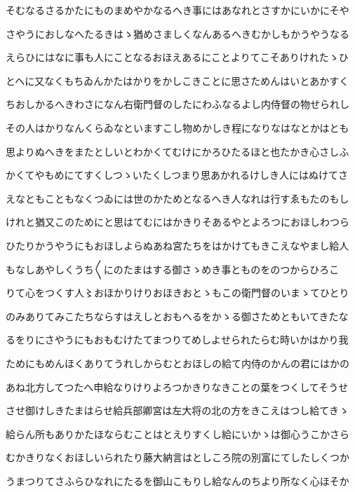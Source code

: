 \documentclass[a4paper,11pt,landscape]{ltjtarticle}
\begin{document}
\par\medskip
そむなるさるかたにものまめやかなるへき事にはあなれとさすかにいかにそや
\par\medskip
さやうにおしなへたるきはゝ猶めさましくなんあるへきむかしもかうやうなる
\par\medskip
えらひにはなに事も人にことなるおほえあるにことよりてこそありけれたゝひ
\par\medskip
とへに又なくもちゐんかたはかりをかしこきことに思さためんはいとあかすく
\par\medskip
ちおしかるへきわさになん右衛門督のしたにわふなるよし内侍督の物せられし
\par\medskip
その人はかりなんくらゐなといますこし物めかしき程になりなはなとかはとも
\par\medskip
思よりぬへきをまたとしいとわかくてむけにかろひたるほと也たかき心さしふ
\par\medskip
かくてやもめにてすくしつゝいたくしつまり思あかれるけしき人にはぬけてさ
\par\medskip
えなともこともなくつゐには世のかためとなるへき人なれは行すゑもたのもし
\par\medskip
けれと猶又このためにと思はてむにはかきりそあるやとよろつにおほしわつら
\par\medskip
ひたりかうやうにもおほしよらぬあね宮たちをはかけてもきこえなやまし給人
\par\medskip
もなしあやしくうち〱にのたまはする御さゝめき事とものをのつからひろこ
\par\medskip
りて心をつくす人〻おほかりけりおほきおとゝもこの衛門督のいまゝてひとり
\par\medskip
のみありてみこたちならすはえしとおもへるをかゝる御さためともいてきたな
\par\medskip
るをりにさやうにもおもむけたてまつりてめしよせられたらむ時いかはかり我
\par\medskip
ためにもめんほくありてうれしからむとおほしの給て内侍のかんの君にはかの
\par\medskip
あね北方してつたへ申給なりけりよろつかきりなきことの葉をつくしてそうせ
\par\medskip
させ御けしきたまはらせ給兵部卿宮は左大将の北の方をきこえはつし給てきゝ
\par\medskip
給らん所もありかたほならむことはとえりすくし給にいかゝは御心うこかさら
\par\medskip
むかきりなくおほしいられたり藤大納言はとしころ院の別富にてしたしくつか
\par\medskip
うまつりてさふらひなれにたるを御山こもりし給なんのちより所なく心ほそか
\end{document}
